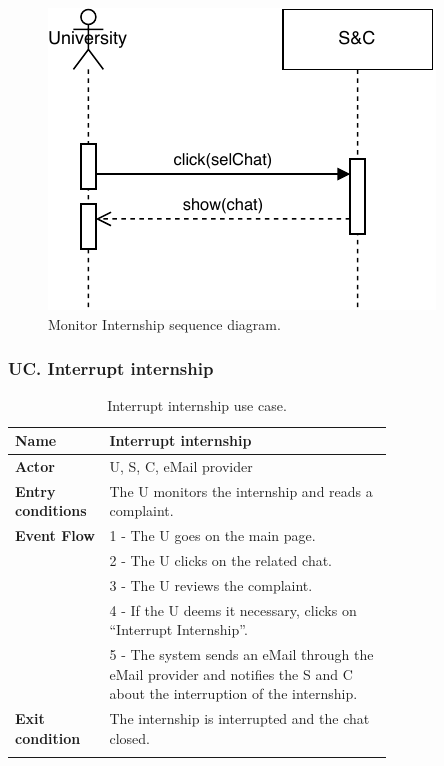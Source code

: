 \begin{figure}[H]
    \begin{center}
        \includegraphics[width=0.6\linewidth]{Images/SequenceDiagram/MonitorInternSD.pdf}
        \caption{Monitor Internship sequence diagram.}
        \label{fig:monitor_intern_seqdiag}%
    \end{center}
\end{figure}

\newpage

\subsubsection*{UC\cuc . Interrupt internship}
\begin{center}
    \begin{longtable}{|l|p{0.75\linewidth}|}
        \hline
        \textbf{Name}               & Interrupt internship\\
        \hline
        \textbf{Actor}              & U, S, C, eMail provider\\
        \hline
        \textbf{Entry conditions}   & The U monitors the internship and reads a complaint.\\
        \hline
        \textbf{Event Flow}         & 1 - The U goes on the main page. \\
        & 2 - The U clicks on the related chat. \\
        & 3 - The U reviews the complaint. \\
        & 4 - If the U deems it necessary, clicks on “Interrupt Internship”. \\
        & 5 - The system sends an eMail through the eMail provider and notifies the S and C about the interruption of the internship. \\
        \hline
        \textbf{Exit condition}   & The internship is interrupted and the chat closed. \\       
        \hline
        \caption{Interrupt internship use case.}
        \label{tab: interrupt_internship_use_case}
    \end{longtable}
\end{center}


